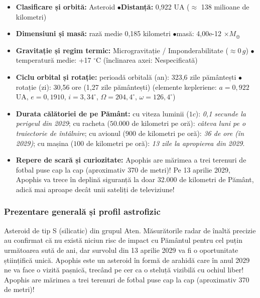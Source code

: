 \begin{tcolorbox}[orbitardata, title={\textbf{Repere esențiale: 99942 Apophis}}]
\small
\begin{itemize}[leftmargin=1.4em, itemsep=2pt, topsep=2pt]
  \item \textbf{Clasificare și orbită:} Asteroid \quad$\bullet$\quad \textbf{Distanță:} 0,922 UA ($\approx$ 138 milioane de kilometri)
  \item \textbf{Dimensiuni și masă:} rază medie 0,185 kilometri \quad$\bullet$\quad masă: 4,00e-12 $\times M_\oplus$
  \item \textbf{Gravitație și regim termic:} Microgravitație / Imponderabilitate ($\approx 0\,g$) \quad$\bullet$\quad temperatură medie: +17 $^\circ$C (înclinarea axei: Nespecificată)
  \item \textbf{Ciclu orbital și rotație:} perioadă orbitală (an): 323,6 zile pământești \quad$\bullet$\quad rotație (zi): 30,56 ore (1,27 zile pământești) (elemente kepleriene: $a = 0,922$ UA, $e = 0,1910$, $i = 3,34^\circ$, $\Omega = 204,4^\circ$, $\omega = 126,4^\circ$)
  \item \textbf{Durata călătoriei de pe Pământ:} cu viteza luminii ($1c$): \emph{0,1 secunde la perigeul din 2029}; cu racheta ($50.000$ de kilometri pe oră): \emph{câteva luni pe o traiectorie de întâlnire}; cu avionul ($900$ de kilometri pe oră): \emph{36 de ore (în 2029)}; cu mașina ($100$ de kilometri pe oră): \emph{13 zile la apropierea din 2029}.
  \item \textbf{Repere de scară și curiozitate:} Apophis are mărimea a trei terenuri de fotbal puse cap la cap (aproximativ 370 de metri)! Pe 13 aprilie 2029, Apophis va trece în deplină siguranță la doar 32.000 de kilometri de Pământ, adică mai aproape decât unii sateliți de televiziune!
\end{itemize}
\end{tcolorbox}

\subsubsection*{Prezentare generală și profil astrofizic}
Asteroid de tip S (silicatic) din grupul Aten. Măsurătorile radar de înaltă precizie au confirmat că nu există niciun risc de impact cu Pământul pentru cel puțin următoarea sută de ani, dar survolul din 13 aprilie 2029 va fi o oportunitate științifică unică. Apophis este un asteroid în formă de arahidă care în anul 2029 ne va face o vizită pașnică, trecând pe cer ca o steluță vizibilă cu ochiul liber! Apophis are mărimea a trei terenuri de fotbal puse cap la cap (aproximativ 370 de metri)!

